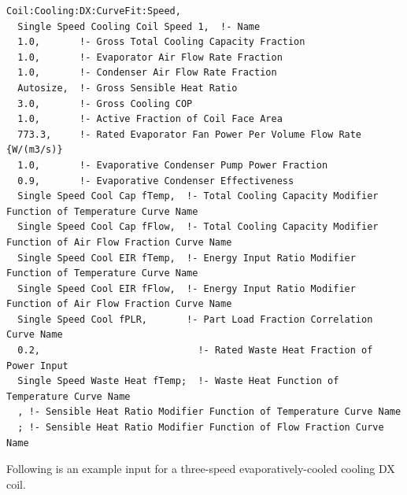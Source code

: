 \begin{lstlisting}
Coil:Cooling:DX:CurveFit:Speed,
  Single Speed Cooling Coil Speed 1,  !- Name
  1.0,       !- Gross Total Cooling Capacity Fraction
  1.0,       !- Evaporator Air Flow Rate Fraction
  1.0,       !- Condenser Air Flow Rate Fraction
  Autosize,  !- Gross Sensible Heat Ratio
  3.0,       !- Gross Cooling COP
  1.0,       !- Active Fraction of Coil Face Area
  773.3,     !- Rated Evaporator Fan Power Per Volume Flow Rate {W/(m3/s)}
  1.0,       !- Evaporative Condenser Pump Power Fraction
  0.9,       !- Evaporative Condenser Effectiveness
  Single Speed Cool Cap fTemp,  !- Total Cooling Capacity Modifier Function of Temperature Curve Name
  Single Speed Cool Cap fFlow,  !- Total Cooling Capacity Modifier Function of Air Flow Fraction Curve Name
  Single Speed Cool EIR fTemp,  !- Energy Input Ratio Modifier Function of Temperature Curve Name
  Single Speed Cool EIR fFlow,  !- Energy Input Ratio Modifier Function of Air Flow Fraction Curve Name
  Single Speed Cool fPLR,       !- Part Load Fraction Correlation Curve Name
  0.2,                            !- Rated Waste Heat Fraction of Power Input
  Single Speed Waste Heat fTemp;  !- Waste Heat Function of Temperature Curve Name
  , !- Sensible Heat Ratio Modifier Function of Temperature Curve Name
  ; !- Sensible Heat Ratio Modifier Function of Flow Fraction Curve Name

\end{lstlisting}

Following is an example input for a three-speed evaporatively-cooled cooling DX coil.

